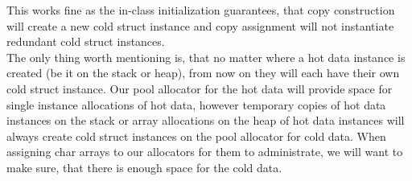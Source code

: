 This works fine as the in-class initialization guarantees, that copy construction will create a new cold struct instance and copy assignment will not instantiate redundant cold struct instances.\\
The only thing worth mentioning is, that no matter where a hot data instance is created (be it on the stack or heap), from now on they will each have their own cold struct instance. Our pool allocator for the hot data will provide space for single instance allocations of hot data, however temporary copies of hot data instances on the stack or array allocations on the heap of hot data instances will always create cold struct instances on the pool allocator for cold data. When assigning char arrays to our allocators for them to administrate, we will want to make sure, that there is enough space for the cold data.

